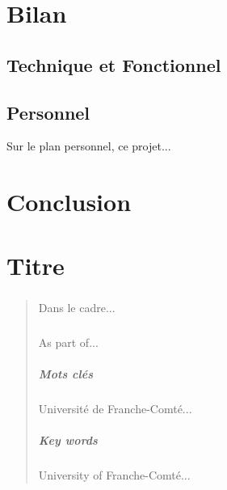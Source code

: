 \documentclass[a4paper,12pt]{report}
\begin{document}
\paragraph{}

\chapter{Bilan}
\section{Technique et Fonctionnel}
\paragraph{}
\section{Personnel}
Sur le plan personnel, ce projet...

\chapter*{Conclusion}

\appendix

\chapter{Titre}

\newpage

\listoffigures

\begin{abstract}
\paragraph{}
Dans le cadre...
\paragraph{}
As part of...
\paragraph{Mots clés}
Université de Franche-Comté...
\paragraph{Key words}
University of Franche-Comté...
\end{abstract}
\end{document}
